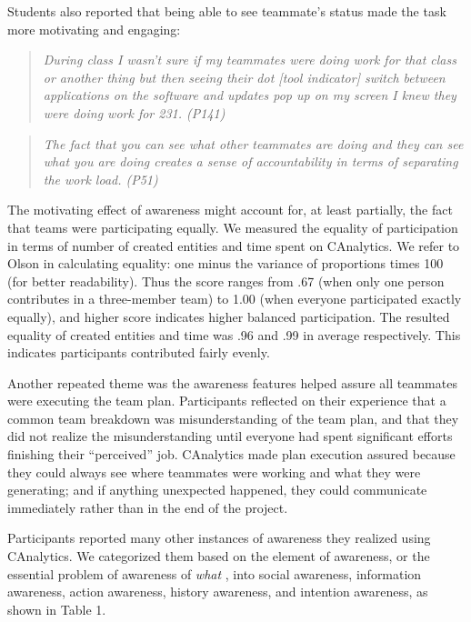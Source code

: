 Students also reported that being able to see teammate's status made the
task more motivating and engaging:

\begin{quote}
\emph{During class I wasn't sure if my teammates were doing work for that
class or another thing but then seeing their dot {[}tool indicator{]}
switch between applications on the software and updates pop up on my
screen I knew they were doing work for 231. (P141)}
\end{quote}

\begin{quote}
\emph{The fact that you can see what other teammates are doing and they can
see what you are doing creates a sense of accountability in terms of
separating the work load. (P51)}
\end{quote}

The motivating effect of awareness might account for, at least partially,
the fact that teams were participating equally. We measured the equality of
participation in terms of number of created entities and time spent on
CAnalytics. We refer to Olson \cite{Olson2017} in calculating equality: one
minus the variance of proportions times 100 (for better readability). Thus
the score ranges from .67 (when only one person contributes in a three-member
team) to 1.00 (when everyone participated exactly equally), and higher
score indicates higher balanced participation. The resulted equality of
created entities and time was .96 and .99 in average respectively. This
indicates participants contributed fairly evenly.

Another repeated theme was the awareness features helped assure all teammates were executing
the team plan. Participants reflected on their experience that a common
team breakdown was misunderstanding of the team plan, and that they did
not realize the misunderstanding until everyone had spent significant efforts
finishing their ``perceived'' job. CAnalytics made plan execution assured
because they could always see where teammates were working and what they
were generating; and if anything unexpected happened, they could communicate
immediately rather than in the end of the project.

Participants reported many other instances of awareness they realized
using CAnalytics. We categorized them based on the element of awareness,
or the essential problem of awareness of \emph{what}
\cite{Schmidt2002}, into social awareness, information awareness,
action awareness, history awareness, and intention awareness, as shown
in Table 1.

